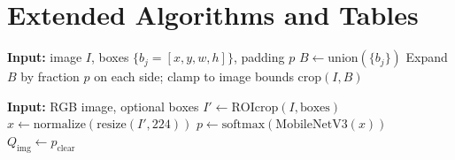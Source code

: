 \section{Extended Algorithms and Tables}
\label{sec:app-extended}

\begin{algorithm}[h]
\caption{COCO ROI crop (union + padding)}
\begin{algorithmic}[1]
\STATE \textbf{Input:} image $I$, boxes $\{b_j=[x,y,w,h]\}$, padding $p$
\STATE $B \leftarrow \mathrm{union}(\{b_j\})$
\STATE Expand $B$ by fraction $p$ on each side; clamp to image bounds
\STATE \RETURN $\mathrm{crop}(I, B)$
\end{algorithmic}
\end{algorithm}

\begin{algorithm}[h]
\caption{B3 inference (MobileNetV3-Small)}
\begin{algorithmic}[1]
\STATE \textbf{Input:} RGB image, optional boxes
\STATE $I' \leftarrow \mathrm{ROIcrop}(I,\mathrm{boxes})$
\STATE $x \leftarrow \mathrm{normalize}(\mathrm{resize}(I', 224))$
\STATE $p \leftarrow \mathrm{softmax}(\mathrm{MobileNetV3}(x))$
\STATE \RETURN $Q_{\mathrm{img}} \leftarrow p_{\mathrm{clear}}$
\end{algorithmic}
\end{algorithm}

\begin{table}[h]
\centering
\caption{B3 training hyperparameters (ShezhenV3 train).}
\label{tab:b3-hparams}
\small
{}
\end{table}


